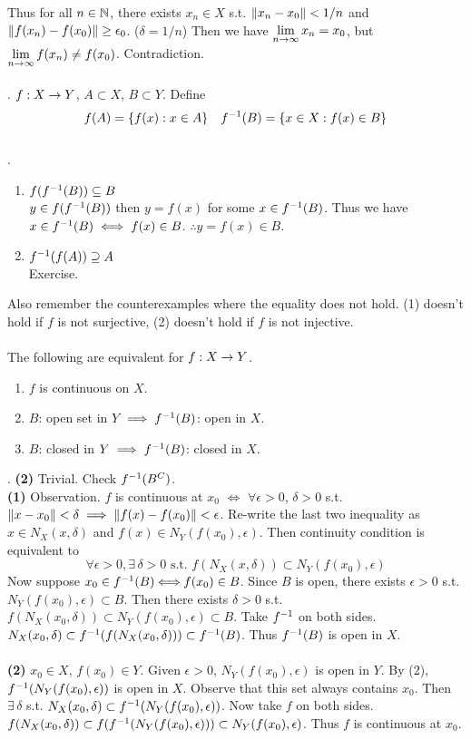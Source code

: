 Thus for all $n\in \mathbb{N}$, there exists $x_n\in X$ s.t. $\left\lVert x_n - x_0\right\rVert < 1/n$ and $\left\lVert f(x_n)-f(x_0)\right\rVert \geq \epsilon_0$. ($\delta = 1/n$) Then we have $\displaystyle\lim_{n\rightarrow\infty} x_n = x_0$, but $\displaystyle \lim_{n\rightarrow\infty} f(x_n) \neq f(x_0)$. Contradiction.\\
\\
. $f:X\rightarrow Y$, $A\subset X$, $B\subset Y$. Define $$f(A) = \{f(x): x\in A\} \quad f^{-1} (B)=\{x\in X: f(x)\in B \}$$
\\
\rmk.
\begin{enumerate}
	\item $f(f^{-1}(B)) \subseteq B$\\
	$y\in f(f^{-1}(B))$ then $y = f(x)$ for some $x\in f^{-1}(B)$. Thus we have $x\in f^{-1}(B) \iff f(x)\in B$. $\therefore y = f(x)\in B$.
	\item $f^{-1}(f(A))\supseteq A$\\
	Exercise.
\end{enumerate}
Also remember the counterexamples where the equality does not hold. (1) doesn't hold if $f$ is not surjective, (2) doesn't hold if $f$ is not injective.\\
\\
 The following are equivalent for $f:X\rightarrow Y$.
\begin{enumerate}
	\item $f$ is continuous on $X$.
	\item $B$: open set in $Y$ $\implies f^{-1}(B)$: open in $X$.
	\item $B$: closed in $Y \implies f^{-1}(B)$: closed in $X$.
\end{enumerate}
\pf. \textbf{(2)} Trivial. Check $f^{-1}(B^C)$.\\
\textbf{(1)} Observation. $f$ is continuous at $x_0$ $\iff$ $\forall \epsilon>0$, $\delta > 0$ s.t. $\left\lVert x-x_0\right\rVert < \delta \implies \left\lVert f(x)-f(x_0)\right\rVert < \epsilon$. Re-write the last two inequality as $x\in N_X(x, \delta)$ and $f(x)\in N_Y(f(x_0), \epsilon)$. Then continuity condition is equivalent to $$\forall \epsilon>0, \exists\,\delta > 0 \text{ s.t. } f(N_X(x, \delta)) \subset N_Y(f(x_0), \epsilon)$$  
Now suppose $x_0\in f^{-1}(B)\!\!\iff\!\! f(x_0) \in B$. Since $B$ is open, there exists $\epsilon>0$ s.t. $N_Y(f(x_0),\epsilon)\subset B$. Then there exists $\delta>0$ s.t. $f(N_X(x_0, \delta)) \subset N_Y(f(x_0), \epsilon) \subset B$. Take $f^{-1}$ on both sides. $N_X(x_0, \delta)\subset f^{-1}(f(N_X(x_0, \delta))) \subset f^{-1} (B)$. Thus $f^{-1} (B)$ is open in $X$.\\
\\
\textbf{(2)} $x_0\in X$, $f(x_0)\in Y$. Given $\epsilon>0$, $N_Y(f(x_0), \epsilon)$ is open in $Y$. By (2), $f^{-1}(N_Y(f(x_0), \epsilon))$ is open in $X$. Observe that this set always contains $x_0$. Then  $\exists\,\delta$ s.t. $N_X(x_0, \delta) \subset f^{-1}(N_Y(f(x_0), \epsilon))$. Now take $f$ on both sides. $f(N_X(x_0, \delta)) \subset f(f^{-1}(N_Y(f(x_0), \epsilon))) \subset N_Y(f(x_0), \epsilon)$. Thus $f$ is continuous at $x_0$.





\pagebreak